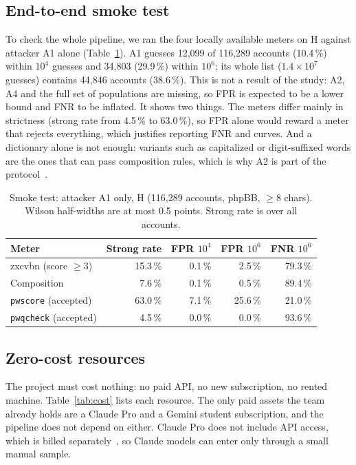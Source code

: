 \documentclass[conference]{IEEEtran}
\begin{document}
\subsection{End-to-end smoke test}
To check the whole pipeline, we ran the four locally available meters on H against attacker A1 alone (Table~\ref{tab:smoke}). A1 guesses 12{,}099 of 116{,}289 accounts (10.4\,\%) within $10^4$ guesses and 34{,}803 (29.9\,\%) within $10^6$; its whole list ($1.4{\times}10^7$ guesses) contains 44{,}846 accounts (38.6\,\%). This is not a result of the study: A2, A4 and the full set of populations are missing, so FPR is expected to be a lower bound and FNR to be inflated. It shows two things. The meters differ mainly in strictness (strong rate from 4.5\,\% to 63.0\,\%), so FPR alone would reward a meter that rejects everything, which justifies reporting FNR and curves. And a dictionary alone is not enough: variants such as capitalized or digit-suffixed words are the ones that can pass composition rules, which is why A2 is part of the protocol~\cite{ur2015}.

\begin{table}[t]
\centering
\caption{Smoke test: attacker A1 only, H (116{,}289 accounts, phpBB, $\ge8$ chars). Wilson half-widths are at most 0.5 points. Strong rate is over all accounts.}
\label{tab:smoke}
\footnotesize
\renewcommand{\arraystretch}{1.12}
\setlength{\tabcolsep}{4pt}
\begin{tabular}{@{}l r r r r@{}}
\toprule
\textbf{Meter} & \textbf{Strong rate} & \textbf{FPR $10^4$} & \textbf{FPR $10^6$} & \textbf{FNR $10^6$}\\
\midrule
zxcvbn (score $\ge3$) & 15.3\,\% & 0.1\,\% & 2.5\,\% & 79.3\,\%\\
Composition & 7.6\,\% & 0.1\,\% & 0.5\,\% & 89.4\,\%\\
\texttt{pwscore} (accepted) & 63.0\,\% & 7.1\,\% & 25.6\,\% & 21.0\,\%\\
\texttt{pwqcheck} (accepted) & 4.5\,\% & 0.0\,\% & 0.0\,\% & 93.6\,\%\\
\bottomrule
\end{tabular}
\end{table}

\subsection{Zero-cost resources}\label{sec:zerocost}
The project must cost nothing: no paid API, no new subscription, no rented machine. Table~\ref{tab:cost} lists each resource. The only paid assets the team already holds are a Claude Pro and a Gemini student subscription, and the pipeline does not depend on either. Claude Pro does not include API access, which is billed separately~\cite{claudebilling}, so Claude models can enter only through a small manual sample.
\end{document}
